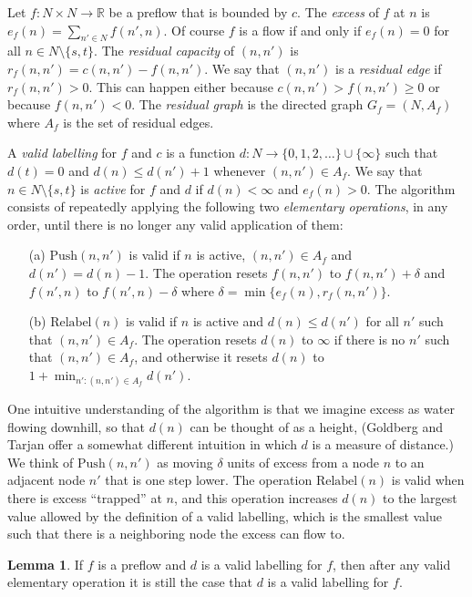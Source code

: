 \documentclass[12pt, A4paper]{article}
\theoremstyle{definition}
\newtheorem{lem}{Lemma}
\renewcommand{\Re}{\mathbb{R}}
\begin{document}
Let $f \colon N \times N \to \Re$ be a preflow that is bounded by $c$.  The \emph{excess} of $f$ at $n$ is $e_f(n) = \sum_{n' \in N} f(n',n)$.  Of course $f$ is a flow if and only if $e_f(n) = 0$ for all $n \in N \setminus \{s,t\}$.  The \emph{residual capacity} of $(n,n')$ is $r_f(n,n') = c(n,n') - f(n,n')$.  We say that $(n,n')$ is a \emph{residual edge} if $r_f(n,n') > 0$.  This can happen either because $c(n,n') > f(n,n') \ge 0$ or because $f(n,n') < 0$.  The \emph{residual graph} is the directed graph $G_f = (N,A_f)$ where $A_f$ is the set of residual edges.

A \emph{valid labelling} for $f$ and $c$ is a function $d \colon N \to \{0,1,2,\ldots\} \cup \{\infty\}$ such that $d(t) = 0$ and $d(n) \le d(n') + 1$ whenever $(n,n') \in A_f$.  We say that $n \in N \setminus \{s,t\}$ is \emph{active} for $f$ and $d$ if $d(n) < \infty$ and $e_f(n) > 0$.
The algorithm consists of repeatedly applying the following two \emph{elementary operations}, in any order, until there is no longer any valid application of them:
\begin{enumerate}
  \item[(a)] $\mathrm{Push}(n,n')$ is valid if $n$ is active, $(n,n') \in A_f$ and $d(n') = d(n) - 1$.  The operation resets $f(n,n')$ to $f(n,n') + \delta$ and $f(n',n)$ to $f(n',n) - \delta$ where $\delta = \min\{e_f(n),r_f(n,n')\}$.
  \item[(b)] $\mathrm{Relabel}(n)$ is valid if $n$ is active and $d(n) \le d(n')$ for all $n'$ such that $(n,n') \in A_f$.  The operation resets $d(n)$ to $\infty$ if there is no $n'$ such that $(n,n') \in A_f$, and otherwise it resets $d(n)$ to $1 + \min_{n' : (n,n') \in A_f} d(n')$.
\end{enumerate}
One intuitive understanding of the algorithm is that we imagine excess as water flowing downhill, so that $d(n)$ can be thought of as a height, (Goldberg and Tarjan offer a somewhat different intuition in which $d$ is a measure of distance.) We think of $\mathrm{Push}(n,n')$ as moving $\delta$ units of excess from a node $n$ to an adjacent node $n'$ that is one step lower.  The operation $\mathrm{Relabel}(n)$ is valid when there is excess ``trapped'' at $n$, and this operation increases $d(n)$ to the largest value allowed by the definition of a valid labelling, which is the smallest value such that there is a neighboring node the excess can flow to.

\begin{lem}
  If $f$ is a preflow and $d$ is a valid labelling for $f$, then after any valid elementary operation it is still the case that $d$ is a valid labelling for $f$.
\end{lem}
\end{document}
